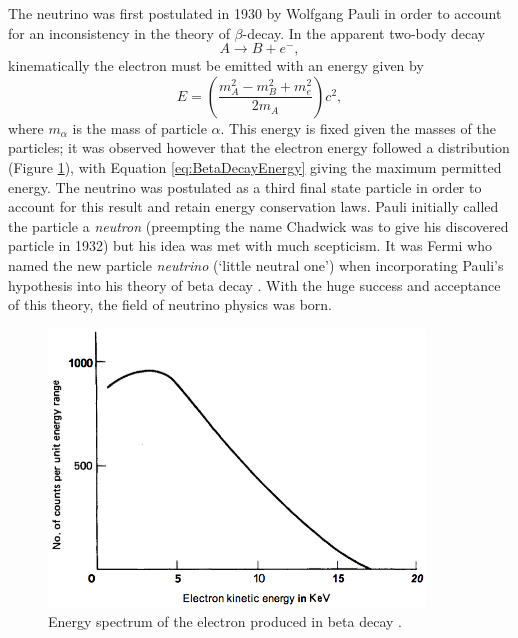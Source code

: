 The neutrino was first postulated in 1930 by Wolfgang Pauli \cite{Pauli1930} in order to account for an inconsistency in the theory of $\beta$-decay.  In the apparent two-body decay
\begin{equation}
A \rightarrow B + e^-,
\end{equation}
kinematically the electron must be emitted with an energy given by
\begin{equation}\label{eq:BetaDecayEnergy}
E = \left( \frac{m_A^2 - m_B^2 + m_e^2}{2m_A} \right) c^2,
\end{equation}
where $m_{\alpha}$ is the mass of particle $\alpha$.  This energy is fixed given the masses of the particles; it was observed however that the electron energy followed a distribution (Figure \ref{fig:BetaDecayEnergy}), with Equation \ref{eq:BetaDecayEnergy} giving the maximum permitted energy.  The neutrino was postulated as a third final state particle in order to account for this result and retain energy conservation laws.  Pauli initially called the particle a \textit{neutron} (preempting the name Chadwick was to give his discovered particle in 1932) but his idea was met with much scepticism.  It was Fermi who named the new particle \textit{neutrino} (`little neutral one') when incorporating Pauli's hypothesis into his theory of beta decay \cite{Fermi1934Italian,Fermi1934German,Wilson1968}.  With the huge success and acceptance of this theory, the field of neutrino physics was born.

\begin{figure}
  \centering
  \includegraphics[width=10cm]{ElectronEnergySpectrumBetaDecay.png}
  \caption[Energy spectrum of the electron produced in beta decay.]{Energy spectrum of the electron produced in beta decay \cite{Lewis1970}.}
  \label{fig:BetaDecayEnergy}
\end{figure}

